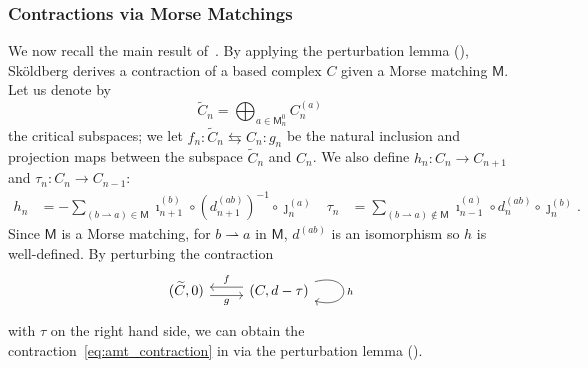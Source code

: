 \documentclass[11pt, table, nothms]{amsart}
\theoremstyle{definition}
\newcommand{\sM}{\mathsf{M}}
\begin{document}
{\subsubsection{Contractions via Morse Matchings}
We now recall the main result of~\cite{Skoldberg2006MorseViewpoint,Skoldberg2018}. By applying the perturbation lemma (), Sk\"oldberg derives a contraction of a based complex $C$ given a Morse matching $\sM$. Let us denote by
\[
    \widetilde{C}_n = \bigoplus_{a \in \sM^0_n} C^{(a)}_n
\] 
the critical subspaces; we let $f_n : \widetilde{C}_n \leftrightarrows C_n: g_n$ be the natural inclusion and projection maps between the subspace $\widetilde{C}_n$ and $C_n$.  We also define $h_n: C_n \to C_{n+1}$ and $\tau_n: C_n \to C_{n - 1}$:
\begin{align}
    h_n &= -\sum_{(b\rightharpoonup a) \in \sM} \imath_{n+1}^{(b)} \circ (d_{n+1}^{(ab)})^{-1}  
    \circ \jmath_n^{(a)} & \tau_n &= \sum_{(b\rightharpoonup a) \notin \sM}\imath_{n-1}^{(a)} \circ d_n^{(ab)} 
    \circ \jmath_n^{(b)} . \label{eq:based_elementary_contr_maps}
\end{align}
Since $\sM$ is a Morse matching, for $b\rightharpoonup a$ in $\sM$, $d^{(ab)}$ is an isomorphism so $h$ is well-defined. By perturbing the contraction 
\begin{equation} \label{eq:basecontraction_morsematching}
    \begin{tikzcd}[ampersand replacement=\&]
    (\widetilde{C}, 0) \ar[r, "g", shift right=0.3em, swap] \&
    (C,d-\tau) 
    \arrow[l, "f", shift right=0.3em, swap]
     \arrow["h", from=1-2, to=1-2, loop, in=345, out=15, distance=10mm]
    \end{tikzcd}
\end{equation}
with $\tau$ on the right hand side, we can obtain the contraction~\cref{eq:amt_contraction} in  via the perturbation lemma (). 

}
\end{document}
